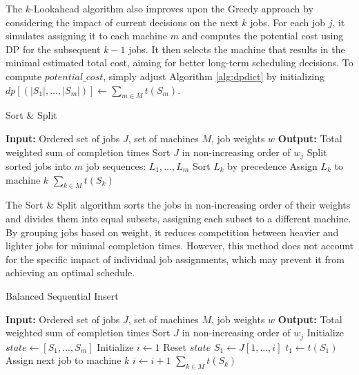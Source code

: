 The $k$-Lookahead algorithm also improves upon the Greedy approach by considering the impact of current decisions on the next $k$ jobs. For each job $j$, it simulates assigning it to each machine $m$ and computes the potential cost using DP for the subsequent $k-1$ jobs. It then selects the machine that results in the minimal estimated total cost, aiming for better long-term scheduling decisions. To compute \texttt{$potential\_cost$}, simply adjust Algorithm \eqref{alg:dpdict} by initializing $dp[( \left| S_1 \right|, \dots, \left| S_m \right|)] \gets \sum_{m \in M} t(S_m)$.

\begin{algorithm}[H]
    \caption{Sort \& Split}\label{alg:sortsplit}
    \begin{algorithmic}[1]
        \State \textbf{Input:} Ordered set of jobs $J$, set of machines $M$, job weights $w$
        \State \textbf{Output:} Total weighted sum of completion times
        \State Sort $J$ in non-increasing order of $w_j$
        \State Split sorted jobs into $m$ job sequences: $L_1, \dots, L_m$
            \State Sort $L_k$ by precedence
            \State Assign $L_k$ to machine $k$
        \EndFor
        \State \Return $\sum_{k \in M} t(S_k)$
    \end{algorithmic}
\end{algorithm}

The Sort \& Split algorithm sorts the jobs in non-increasing order of their weights and divides them into equal subsets, assigning each subset to a different machine. By grouping jobs based on weight, it reduces competition between heavier and lighter jobs for minimal completion times. However, this method does not account for the specific impact of individual job assignments, which may prevent it from achieving an optimal schedule.

\begin{algorithm}[H]
    \caption{Balanced Sequential Insert}\label{alg:bsi}
    \begin{algorithmic}[1]
        \State \textbf{Input:} Ordered set of jobs $J$, set of machines $M$, job weights $w$
        \State \textbf{Output:} Total weighted sum of completion times
        \State Sort $J$ in non-increasing order of $w_j$
        \State Initialize $state \gets [S_1, \dots, S_m]$
        \State Initialize $i \gets 1$
            \State Reset $state$
            \State $S_1 \gets J[1, \dots, i]$
            \State $t_1 \gets t(S_1)$
                    \State Assign next job to machine $k$
                \EndWhile
            \EndFor
            \State $i \gets i + 1$
        \EndWhile
        \State \Return $\sum_{k \in M} t(S_k)$
    \end{algorithmic}
\end{algorithm}

